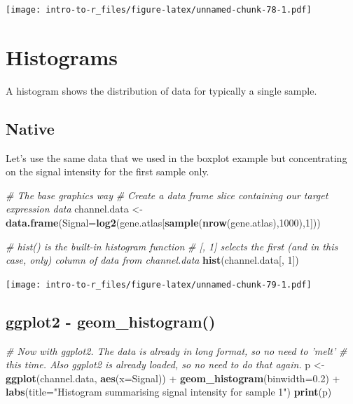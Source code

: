 \documentclass[a4paper]{book}
\newenvironment{Shaded}{\begin{snugshade}}{\end{snugshade}}
\newcommand{\KeywordTok}[1]{\textcolor[rgb]{0.13,0.29,0.53}{\textbf{{#1}}}}
\newcommand{\DataTypeTok}[1]{\textcolor[rgb]{0.13,0.29,0.53}{{#1}}}
\newcommand{\DecValTok}[1]{\textcolor[rgb]{0.00,0.00,0.81}{{#1}}}
\newcommand{\FloatTok}[1]{\textcolor[rgb]{0.00,0.00,0.81}{{#1}}}
\newcommand{\StringTok}[1]{\textcolor[rgb]{0.31,0.60,0.02}{{#1}}}
\newcommand{\CommentTok}[1]{\textcolor[rgb]{0.56,0.35,0.01}{\textit{{#1}}}}
\newcommand{\NormalTok}[1]{{#1}}
\renewenvironment{Shaded}
{\vspace{1.5em}\begin{leftbar}\begin{snugshade}}
{\end{snugshade}\end{leftbar}\vspace{3pt}}
\begin{document}
\texttt{[image: intro-to-r\_files/figure-latex/unnamed-chunk-78-1.pdf]}

\section{Histograms}\label{histograms}

A histogram shows the distribution of data for typically a single
sample.

\subsection{Native}\label{native-1}

Let's use the same data that we used in the boxplot example but
concentrating on the signal intensity for the first sample only.

\begin{Shaded}
\begin{Highlighting}[]
\CommentTok{# The base graphics way}
\CommentTok{# Create a data frame slice containing our target expression data}
\NormalTok{channel.data <-}\StringTok{ }\KeywordTok{data.frame}\NormalTok{(}\DataTypeTok{Signal=}\KeywordTok{log2}\NormalTok{(gene.atlas[}\KeywordTok{sample}\NormalTok{(}\KeywordTok{nrow}\NormalTok{(gene.atlas),}\DecValTok{1000}\NormalTok{),}\DecValTok{1}\NormalTok{]))}

\CommentTok{# hist() is the built-in histogram function}
\CommentTok{# [, 1] selects the first (and in this case, only) column of data from channel.data}
\KeywordTok{hist}\NormalTok{(channel.data[, }\DecValTok{1}\NormalTok{])}
\end{Highlighting}
\end{Shaded}

\texttt{[image: intro-to-r\_files/figure-latex/unnamed-chunk-79-1.pdf]}

\subsection{ggplot2 - geom\_histogram()}\label{ggplot2---geom_histogram}

\begin{Shaded}
\begin{Highlighting}[]
\CommentTok{# Now with ggplot2. The data is already in long format, so no need to 'melt'}
\CommentTok{# this time. Also ggplot2 is already loaded, so no need to do that again.}
\NormalTok{p <-}\StringTok{ }\KeywordTok{ggplot}\NormalTok{(channel.data, }\KeywordTok{aes}\NormalTok{(}\DataTypeTok{x=}\NormalTok{Signal)) +}\StringTok{ }
\StringTok{  }\KeywordTok{geom_histogram}\NormalTok{(}\DataTypeTok{binwidth=}\FloatTok{0.2}\NormalTok{) +}
\StringTok{  }\KeywordTok{labs}\NormalTok{(}\DataTypeTok{title=}\StringTok{"Histogram summarising signal intensity for sample 1"}\NormalTok{)}
\KeywordTok{print}\NormalTok{(p)}
\end{Highlighting}
\end{Shaded}
\end{document}
